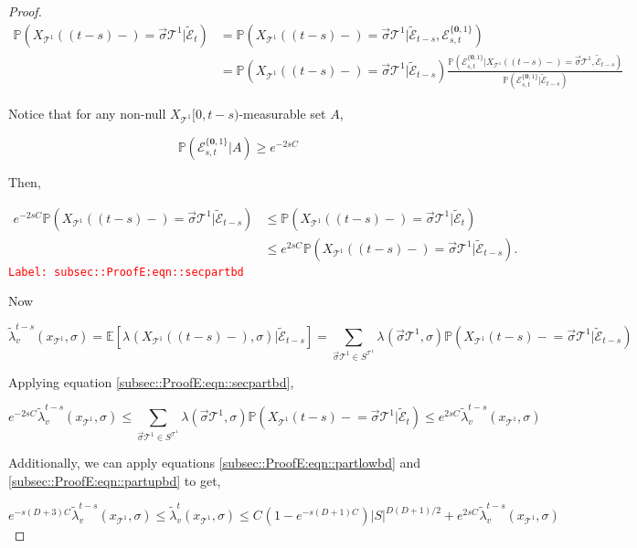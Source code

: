 \documentclass[12pt]{article}
\newcommand{\mb}{\mathbb}
\newcommand{\mc}{\mathcal}
\newcommand{\tr}{\textcolor{red}}
\newcommand{\labe}[1]{\tr{\texttt{Label: #1}}}
\newcommand{\pr}{\mb{P}}							%
\newcommand{\ex}[1]{\mb{E}\left[#1\right]}			%
\renewcommand{\root}{\mathbf{0}}				%
\renewcommand{\v}{v}							%
\renewcommand{\S}{S}							%
\newcommand{\s}{\sigma}							%
\newcommand{\sv}{\vec{\s}}						%
\renewcommand{\t}{t}							%
\newcommand{\degr}{D}								%
\newcommand{\pup}[1]{^{#1}}							%
\newcommand{\tree}{\mc{T}}							%
\renewcommand{\tt}{s}								%
\newcommand{\XState}[1]{\S^{#1}}				%
\newcommand{\rxvt}[2]{X_{#1}{(#2)}}					%
\newcommand{\xvts}[2]{x_{#1}{#2}}					%
\newcommand{\rxvts}[2]{X_{#1}{#2}}					%
\newcommand{\rate}[1]{\lambda_{#1}}					%
\newcommand{\crate}[2]{\alt{\lambda}_{#1}^{#2}}		%
\newcommand{\const}[1]{C_{#1}}						%
\newcommand{\alt}{\widetilde}						%
\newcommand{\evnt}{\mc{E}}						%
\newcommand{\typset}{A}							%
\begin{document}
\begin{proof}
\begin{align*}
\pr\left(\rxvt{\tree\pup{1}}{(\t-\tt)-}=\sv{}{\tree\pup{1}}|\alt{\evnt}_\t\right) &= \pr\left(\rxvt{\tree\pup{1}}{(\t-\tt)-}=\sv{}{\tree\pup{1}}|\alt{\evnt}_{\t-\tt},\evnt^{\{\root,1\}}_{\tt,\t}\right)\\
&=\pr\left(\rxvt{\tree\pup{1}}{(\t-\tt)-}=\sv{}{\tree\pup{1}}|\alt{\evnt}_{\t-\tt}\right)\frac{\pr\left(\evnt^{\{\root,1\}}_{\tt,\t}|\rxvt{\tree\pup{1}}{(\t-\tt)-}=\sv{}{\tree\pup{1}},\alt{\evnt}_{\t-\tt}\right)}{\pr\left(\evnt^{\{\root,1\}}_{\tt,\t}|\alt{\evnt}_{\t-\tt}\right)}
\end{align*}

Notice that for any non-null \(\rxvts{\tree\pup{1}}{[0,\t-\tt)}\)-measurable set \(\typset\), 

\[\pr(\evnt^{\{\root,1\}}_{\tt,\t}|\typset) \geq e^{-2\tt\const{}}\]

Then,

\begin{align}
e^{-2\tt\const{}}\pr\left(\rxvt{\tree\pup{1}}{(\t-\tt)-}=\sv{}{\tree\pup{1}}|\alt{\evnt}_{\t-\tt}\right) &\leq \pr\left(\rxvt{\tree\pup{1}}{(\t-\tt)-}=\sv{}{\tree\pup{1}}|\alt{\evnt}_{\t}\right)\nonumber\\
&\leq e^{2\tt\const{}}\pr\left(\rxvt{\tree\pup{1}}{(\t-\tt)-}=\sv{}{\tree\pup{1}}|\alt{\evnt}_{\t-\tt}\right).
\label{subsec::ProofE:eqn::secpartbd}
\end{align}
\labe{subsec::ProofE:eqn::secpartbd}

Now

\[\crate{\v}{\t-\tt}(\xvts{\tree\pup{1}}{},\s) = \ex{\rate{}(\rxvt{\tree\pup{1}}{(\t-\tt)-},\s)|\alt{\evnt}_{\t-\tt}} = \sum_{\sv{}{\tree\pup{1}}\in \S^{\tree\pup{1}}}\rate{}(\sv{}{\tree\pup{1}},\s)\pr\left(\rxvts{\tree\pup{1}}{(\t-\tt)-} = \sv{}{\tree\pup{1}}|\alt{\evnt}_{\t-\tt}\right)\]

Applying equation \eqref{subsec::ProofE:eqn::secpartbd},

\[e^{-2\tt\const{}}\crate{\v}{\t-\tt}(\xvts{\tree\pup{1}}{},\s) \leq \sum_{\sv{}{\tree\pup{1}}\in \S^{\tree\pup{1}}} \lambda(\sv{}{\tree\pup{1}},\s)\pr(\rxvts{\tree\pup{1}}{(\t-\tt)-} = \sv{}{\tree\pup{1}}|\alt{\evnt}_\t)\leq e^{2\tt\const{}}\crate{\v}{\t-\tt}(\xvts{\tree\pup{1}}{},\s)\]

Additionally, we can apply equations \eqref{subsec::ProofE:eqn::partlowbd} and  \eqref{subsec::ProofE:eqn::partupbd} to get,

\[e^{-\tt(\degr+3)\const{}}\crate{\v}{\t-\tt}(\xvts{\tree\pup{1}}{},\s) \leq \crate{\v}{\t}(\xvts{\tree\pup{1}}{},\s) \leq \const{}(1 - e^{-\tt(\degr+1)\const{}})|S|^{\degr(\degr+1)/2} + e^{2\tt\const{}}\crate{\v}{\t-\tt}(\xvts{\tree\pup{1}}{},\s)\]


\end{proof}
\end{document}

